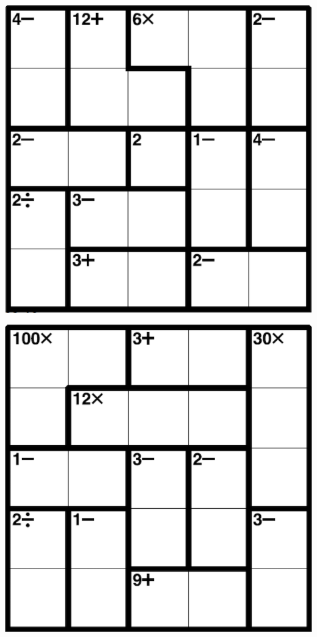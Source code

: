 
\includegraphics[scale=1]{Gambar/Lampiran/5x5_9.png}

\includegraphics[scale=1]{Gambar/Lampiran/5x5_10.png}

